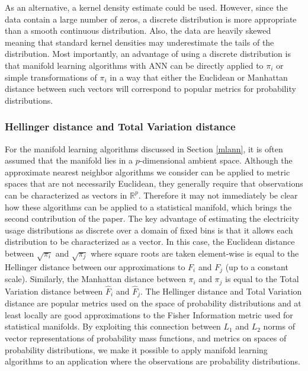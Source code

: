 \documentclass[11pt,a4paper,]{article}
\begin{document}
As an alternative, a kernel density estimate could be used. However, since the data contain a large number of zeros, a discrete distribution is more appropriate than a smooth continuous distribution. Also, the data are heavily skewed meaning that standard kernel densities may underestimate the tails of the distribution. Most importantly, an advantage of using a discrete distribution is that manifold learning algorithms with ANN can be directly applied to \(\pi_i\) or simple transformations of \(\pi_i\) in a way that either the Euclidean or Manhattan distance between such vectors will correspond to popular metrics for probability distributions.

\hypertarget{hellinger-distance-and-total-variation-distance}{%
\subsubsection*{Hellinger distance and Total Variation distance}\label{hellinger-distance-and-total-variation-distance}}

For the manifold learning algorithms discussed in Section \ref{mlann}, it is often assumed that the manifold lies in a \(p\)-dimensional ambient space. Although the approximate nearest neighbor algorithms we consider can be applied to metric spaces that are not necessarily Euclidean, they generally require that observations can be characterized as vectors in \(\mathbb{R}^p\). Therefore it may not immediately be clear how these algorithms can be applied to a statistical manifold, which brings the second contribution of the paper. The key advantage of estimating the electricity usage distributions as discrete over a domain of fixed bins is that it allows each distribution to be characterized as a vector. In this case, the Euclidean distance between \(\sqrt{\pi_{i}}\) and \(\sqrt{\pi_{j}}\) where square roots are taken element-wise is equal to the Hellinger distance between our approximations to \(F_{i}\) and \(F_{j}\) (up to a constant scale). Similarly, the Manhattan distance between \(\pi_{i}\) and \(\pi_{j}\) is equal to the Total Variation distance between \(\hat{F}_{i}\) and \(\hat{F}_{j}\). The Hellinger distance and Total Variation distance are popular metrics used on the space of probability distributions \autocite{Hellinger_undated-rs,LeCam1973-da} and at least locally are good approximations to the Fisher Information metric used for statistical manifolds. By exploiting this connection between \(L_1\) and \(L_2\) norms of vector representations of probability mass functions, and metrics on spaces of probability distributions, we make it possible to apply manifold learning algorithms to an application where the observations are probability distributions.
\end{document}
